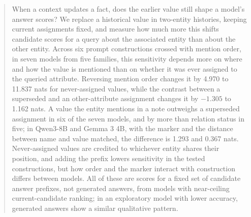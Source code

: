 \begin{abstract}
When a context updates a fact, does the earlier value still shape a model's answer scores? We replace a historical value in two-entity histories, keeping current assignments fixed, and measure how much more this shifts candidate scores for a query about the associated entity than about the other entity. Across six prompt constructions crossed with mention order, in seven models from five families, this sensitivity depends more on where and how the value is mentioned than on whether it was ever assigned to the queried attribute. Reversing mention order changes it by 4.970 to 11.837 nats for never-assigned values, while the contrast between a superseded and an other-attribute assignment changes it by $-1.305$ to 1.162 nats. A value the entity mentions in a note outweighs a superseded assignment in six of the seven models, and by more than relation status in five; in Qwen3-8B and Gemma 3 4B, with the marker  and the distance between name and value matched, the difference is 1.293 and 0.367 nats. Never-assigned values are credited to whichever entity shares their position, and adding the prefix  lowers sensitivity in the tested constructions, but how order and the marker interact with construction differs between models. All of these are scores for a fixed set of candidate answer prefixes, not generated answers, from models with near-ceiling current-candidate ranking; in an exploratory model with lower accuracy, generated answers show a similar qualitative pattern.
\end{abstract}
